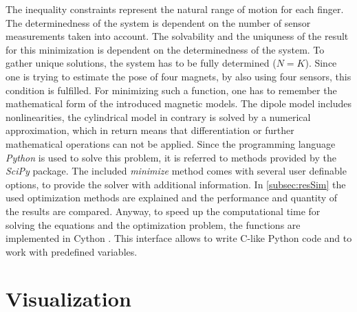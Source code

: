 The inequality constraints represent the natural range of motion for each finger. The determinedness of the system is dependent on the number of sensor measurements taken into account. The solvability and the uniquness of the result for this minimization is dependent on the determinedness of the system. To gather unique solutions, the system has to be fully determined ($ N = K $). Since one is trying to estimate the pose of four magnets, by also using four sensors, this condition is fulfilled. For minimizing such a function, one has to remember the mathematical form of the introduced magnetic models. The dipole model includes nonlinearities, the cylindrical model in contrary is solved by a numerical approximation, which in return means that differentiation or further mathematical operations can not be applied. Since the programming language \emph{Python} \cite{python} is used to solve this problem, it is referred to methods provided by the \emph{SciPy} \cite{scipy} package. The included \emph{minimize} method comes with several user definable options, to provide the solver with additional information. In \ref{subsec:resSim} the used optimization methods are explained and the performance and quantity of the results are compared. Anyway, to speed up the computational time for solving the equations and the optimization problem, the functions are implemented in Cython \cite{cython}. This interface allows to write C-like Python code and to work with predefined variables. 


\section{Visualization} \label{sec:visual}

